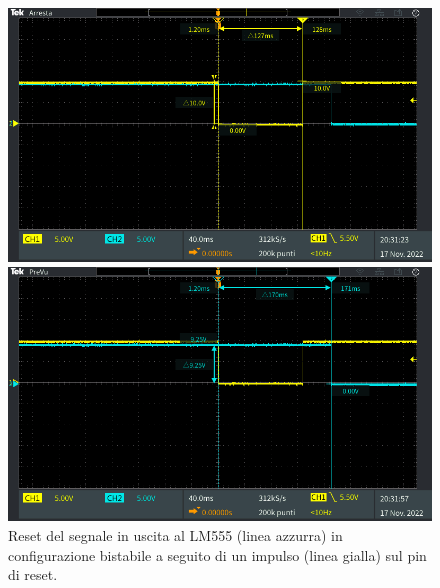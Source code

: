 \begin{figure}[tbh]
	\centering
	\begin{minipage}{.496\textwidth}
		\includegraphics[width=\linewidth]{./ImageFiles/Laboratorio 5/TEK00010.PNG}
	\end{minipage}
	\begin{minipage}{.496\textwidth}
		\includegraphics[width=\linewidth]{./ImageFiles/Laboratorio 5/TEK00011.PNG}
	\end{minipage}
	\caption{Reset del segnale in uscita al LM555 (linea azzurra) in configurazione bistabile a seguito di un impulso (linea gialla) sul pin di reset.}
	\label{fig:circuito_2_scope}
\end{figure}

